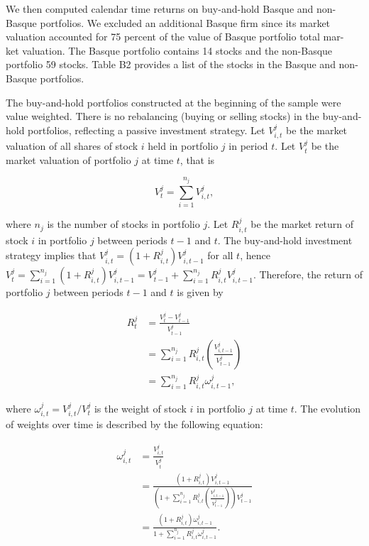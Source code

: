 \documentclass[10pt]{article}
\begin{document}
We then computed calendar time returns on buy-and-hold Basque and non-Basque portfolios. We excluded an additional Basque firm since its market valuation accounted for 75 percent of the value of Basque portfolio total mar-\\
ket valuation. The Basque portfolio contains 14 stocks and the non-Basque portfolio 59 stocks. Table B2 provides a list of the stocks in the Basque and non-Basque portfolios.

The buy-and-hold portfolios constructed at the beginning of the sample were value weighted. There is no rebalancing (buying or selling stocks) in the buy-and-hold portfolios, reflecting a passive investment strategy. Let $V_{i, t}^{j}$ be the market valuation of all shares of stock $i$ held in portfolio $j$ in period $t$. Let $V_{t}^{j}$ be the market valuation of portfolio $j$ at time $t$, that is

$$
V_{t}^{j}=\sum_{i=1}^{n_{j}} V_{i, t}^{j},
$$

where $n_{j}$ is the number of stocks in portfolio $j$. Let $R_{i, t}^{j}$ be the market return of stock $i$ in portfolio $j$ between periods $t-1$ and $t$. The buy-and-hold investment strategy implies that $V_{i, t}^{j}=\left(1+R_{i, t}^{j}\right) V_{i, t-1}^{j}$ for all $t$, hence $V_{t}^{j}= \sum_{i=1}^{n_{j}}\left(1+R_{i, t}^{j}\right) V_{i, t-1}^{j}=V_{t-1}^{j}+\sum_{i=1}^{n_{j}} R_{i, t}^{j} V_{i, t-1}^{j}$. Therefore, the return of portfolio $j$ between periods $t-1$ and $t$ is given by

$$
\begin{aligned}
R_{t}^{j} & =\frac{V_{t}^{j}-V_{t-1}^{j}}{V_{t-1}^{j}} \\
& =\sum_{i=1}^{n_{j}} R_{i, t}^{j}\left(\frac{V_{i, t-1}^{j}}{V_{t-1}^{j}}\right) \\
& =\sum_{i=1}^{n_{j}} R_{i, t}^{j} \omega_{i, t-1}^{j},
\end{aligned}
$$

where $\omega_{i, t}^{j}=V_{i, t}^{j} / V_{t}^{j}$ is the weight of stock $i$ in portfolio $j$ at time $t$. The evolution of weights over time is described by the following equation:

$$
\begin{aligned}
\omega_{i, t}^{j} & =\frac{V_{i, t}^{j}}{V_{t}^{j}} \\
& =\frac{\left(1+R_{i, t}^{j}\right) V_{i, t-1}^{j}}{\left(1+\sum_{i=1}^{n_{j}} R_{i, t}^{j}\left(\frac{V_{i, t-1}^{j}}{V_{t-1}^{j}}\right)\right) V_{t-1}^{j}} \\
& =\frac{\left(1+R_{i, t}^{j}\right) \omega_{i, t-1}^{j}}{1+\sum_{i=1}^{n_{j}} R_{i, t}^{j} \omega_{i, t-1}^{j}} .
\end{aligned}
$$
\end{document}
